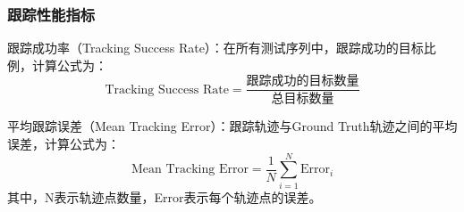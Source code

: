 \subsubsection{跟踪性能指标}

跟踪成功率（Tracking Success Rate）：在所有测试序列中，跟踪成功的目标比例，计算公式为：
\[\text{Tracking Success Rate} = \frac{\text{跟踪成功的目标数量}}{\text{总目标数量}}\]

平均跟踪误差（Mean Tracking Error）：跟踪轨迹与Ground Truth轨迹之间的平均误差，计算公式为：
\[\text{Mean Tracking Error} = \frac{1}{N} \sum_{i=1}^{N} \text{Error}_i\]
其中，N表示轨迹点数量，Error表示每个轨迹点的误差。













